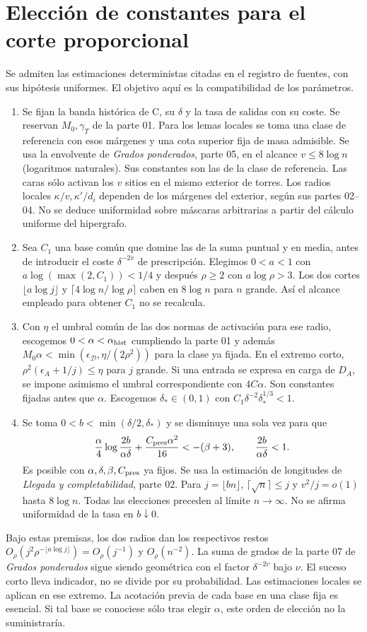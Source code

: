 \section{Elección de constantes para el corte proporcional}
Se admiten las estimaciones deterministas citadas en el registro de fuentes, con sus
hipótesis uniformes. El objetivo aquí es la compatibilidad de los parámetros.
\begin{enumerate}
\item Se fijan la banda histórica de C, su $\delta$ y la tasa de salidas con su coste.
Se reservan $M_0,\gamma_T$ de la parte 01. Para los lemas locales se toma una clase
de referencia con esos márgenes y una cota superior fija de masa admisible.
Se usa la envolvente de \emph{Grados ponderados}, parte 05, en el alcance
$v\le 8\log n$ (logaritmos naturales). Sus constantes son las de la clase de referencia.
Las caras sólo activan los $v$ sitios en el mismo exterior de torres. Los radios locales
$\kappa/v,\kappa'/d_i$ dependen de los márgenes del exterior, según sus partes 02--04.
No se deduce uniformidad sobre máscaras arbitrarias a partir del cálculo uniforme del hipergrafo.
\item Sea $C_1$ una base común que domine las de la suma puntual y en media, antes
de introducir el coste $\delta^{-2v}$ de prescripción. Elegimos $0<a<1$ con
$a\log(\max(2,C_1))<1/4$ y después $\rho\ge2$ con $a\log\rho>3$.
Los dos cortes $\lfloor a\log j\rfloor$ y $\lceil4\log n/\log\rho\rceil$ caben en
$8\log n$ para $n$ grande. Así el alcance empleado para obtener $C_1$ no se recalcula.
\item Con $\eta$ el umbral común de las dos normas de activación para ese radio,
escogemos $0<\alpha<\alpha_{\rm hist}$ cumpliendo la parte 01 y además
$M_0\alpha<\min(\epsilon_{\mathcal D},\eta/(2\rho^2))$ para la clase ya fijada.
En el extremo corto, $\rho^2(\epsilon_A+1/j)\le\eta$ para $j$ grande.
Si una entrada se expresa en carga de $D_A$, se impone asimismo el umbral
correspondiente con $4C\alpha$. Son constantes fijadas antes que $\alpha$.
Escogemos $\delta_*\in(0,1)$ con $C_1\delta^{-2}\delta_*^{1/3}<1$.
\item Se toma $0<b<\min(\delta/2,\delta_*)$ y se disminuye una sola vez para que
\[
 \frac{\alpha}{4}\log\frac{2b}{\alpha\delta}
        +\frac{C_{\rm pres}\alpha^2}{16}<-(\beta+3),\qquad
 \frac{2b}{\alpha\delta}<1 .
\]
Es posible con $\alpha,\delta,\beta,C_{\rm pres}$ ya fijos. Se usa la estimación de
longitudes de \emph{Llegada y completabilidad}, parte 02. Para $j=\lfloor bn\rfloor$,
$\lceil\sqrt n\rceil\le j$ y $v^2/j=o(1)$ hasta $8\log n$. Todas las elecciones
preceden al límite $n\to\infty$. No se afirma uniformidad de la tasa en $b\downarrow0$.
\end{enumerate}
Bajo estas premisas, los dos radios dan los respectivos restos
$O_\rho(j^2\rho^{-\lfloor a\log j\rfloor})=O_\rho(j^{-1})$ y $O_\rho(n^{-2})$.
La suma de grados de la parte 07 de \emph{Grados ponderados} sigue siendo geométrica
con el factor $\delta^{-2v}$ bajo $\nu$. El suceso corto lleva indicador, no se divide
por su probabilidad. Las estimaciones locales se aplican en ese extremo.
La acotación previa de cada base en una clase fija es esencial. Si tal base
se conociese sólo tras elegir $\alpha$, este orden de elección no la suministraría.
